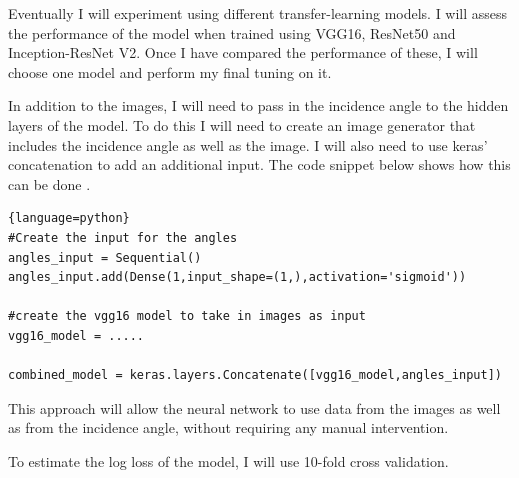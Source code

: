 \documentclass{article}
\begin{document}
Eventually I will experiment using different transfer-learning models. I will assess the performance of the model when trained using VGG16, ResNet50 and Inception-ResNet V2. Once I have compared the performance of these, I will choose one model and perform my final tuning on it. 

In addition to the images, I will need to pass in the incidence angle to the hidden layers of the model. To do this I will need to create an image generator that includes the incidence angle as well as the image. I will also need to use keras' concatenation to add an additional input. The code snippet below shows how this can be done \cite{keras-layers}. 
\begin{lstlisting}{language=python}
#Create the input for the angles
angles_input = Sequential()
angles_input.add(Dense(1,input_shape=(1,),activation='sigmoid'))

#create the vgg16 model to take in images as input 
vgg16_model = ..... 

combined_model = keras.layers.Concatenate([vgg16_model,angles_input])
\end{lstlisting}


This approach will allow the neural network to use data from the images as well as from the incidence angle, without requiring any manual intervention. 

To estimate the log loss of the model, I will use 10-fold cross validation. 



{}
\end{document}
